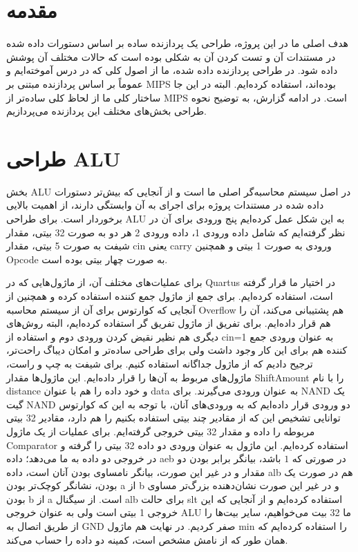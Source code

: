 \documentclass[12pt,titlepage,a4page , tikz , multi,table , svgnames,xcdraw]{article}
\begin{document}
\newpage
\pagestyle{fancy}
\fancyhf{}
\fancyfoot{}

\cfoot{\thepage}



\newpage

\section{مقدمه}

هدف اصلی ما در این پروژه، طراحی یک پردازنده ساده بر اساس دستورات داده شده در مستندات آن و تست کردن آن به شکلی بوده است که حالات مختلف آن پوشش داده شود. در طراحی پردازنده داده شده، ما از اصول کلی که در درس آموخته‌ایم و عموماً بر اساس پردازنده مبتنی بر MIPS بوده‌اند، استفاده کرده‌ایم. البته در این جا ساختار کلی ما از لحاظ کلی ساده‌تر از MIPS است. در ادامه گزارش، به توضیح نحوه طراحی بخش‌های مختلف این پردازنده می‌پردازیم.


\newpage

\section{طراحی ALU}

بخش ALU در اصل سیستم محاسبه‌گر اصلی ما است و از آنجایی که بیش‌تر دستورات داده شده در مستندات پروژه برای اجرای به آن وابستگی دارند، از اهمیت بالایی برخوردار است. برای طراحی ALU به این شکل عمل کرده‌ایم پنج ورودی برای آن در نظر گرفته‌ایم که شامل داده ورودی 1، داده ورودی 2 هر دو به صورت 32 بیتی، مقدار شیفت به صورت 5 بیتی، مقدار cin یعنی carry ورودی به صورت 1 بیتی و همچنین Opcode به صورت چهار بیتی بوده است. 

برای عملیات‌های مختلف آن، از ماژول‌هایی که در Quartus در اختیار ما قرار گرفته است، استفاده کرده‌ایم. برای جمع از ماژول جمع کننده استفاده کرده و همچنین از آنجایی که کوارتوس برای آن از سیستم محاسبه Overflow هم پشتیبانی می‌کند، آن را هم قرار داده‌ایم. برای تفریق از ماژول تفریق گر استفاده کرده‌ایم، البته روش‌های دیگری هم نظیر نقیض کردن ورودی دوم و استفاده از cin=1 به عنوان ورودی جمع کننده هم برای این کار وجود داشت ولی برای طراحی ساده‌تر و امکان دیباگ راحت‌تر، ترجیح دادیم که از ماژول جداگانه استفاده کنیم. برای شیفت به چپ و راست، ماژول‌های مربوط به آن‌ها را قرار داده‌ایم. این ماژول‌ها مقدار ShiftAmount را با نام distance و خود داده را هم با عنوان data به عنوان ورودی می‌گیرند. برای NAND یک گیت NAND دو ورودی قرار داده‌ایم که به ورودی‌های آنان، با توجه به این که کوارتوس توانایی تشخیص این که از مقادیر چند بیتی استفاده بکنیم را هم دارد، مقادیر 32 بیتی مربوطه را داده و مقدار 32 بیتی خروجی گرفته‌ایم. برای عملیات  از یک ماژول Comparator استفاده کرده‌ایم. این ماژول به عنوان ورودی دو داده 32 بیتی را گرفته و در خروجی دو داده به ما می‌دهد؛ داده aeb در صورتی که $1$ باشد، بیانگر برابر بودن دو مقدار و در غیر این صورت، بیانگر نامساوی بودن آنان است، داده alb هم در صورت یک بودن، نشانگر کوچک‌تر بودن a از b و در غیر این صورت نشان‌دهنده بزرگ‌تر مساوی بودن b از a است. از سیگنال alb برای حالت slt استفاده کرده‌ایم و از آنجایی که این خروجی 1 بیتی است ولی به عنوان خروجی ALU ما 32 بیت می‌خواهیم، سایر بیت‌ها را از طریق اتصال به GND صفر کردیم. در نهایت هم ماژول min را استفاده کرده‌ایم که همان طور که از نامش مشخص است، کمینه دو داده را حساب می‌کند.
\end{document}
